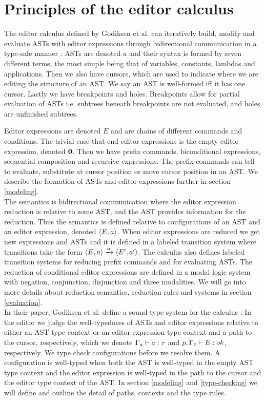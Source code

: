 \section{Principles of the editor calculus}
\label{principles}

The editor calculus defined by Godiksen et al. can iteratively build, modify
and evaluate ASTs with editor expressions through bidirectional communication in
a type-safe manner \pepm. ASTs are denoted $a$ and their syntax is formed by
seven different terms, the most simple being that of variables, constants,
lambdas and applications. Then we also have cursors, which are used to indicate
where we are editing the structure of an AST. We say an AST is well-formed iff
it has one cursor. Lastly we have breakpoints and holes. Breakpoints allow for
partial evaluation of ASTs i.e. subtrees beneath breakpoints are not evaluated,
and holes are unfinished subtrees.

Editor expressions are denoted $E$ and are chains of different commands and
conditions. The trivial case that end editor expressions is the empty editor
expression, denoted $\mathbf{0}$. Then we have prefix commands, biconditional
expressions, sequential composition and recursive expressions. The prefix
commands can tell to evaluate, substitute at cursor position or move cursor
position in an AST. We describe the formation of ASTs and editor expressions
further in section \ref{modeling}.\\

The semantics is bidirectional communication where the editor expression
reduction is relative to some AST, and the AST provides information for the
reduction. Thus the semantics is defined relative to configurations of an AST
and an editor expression, denoted $\langle E,a \rangle$. When editor expressions
are reduced we get new expressions and ASTs and it is defined in a labeled
transition system where transitions take the form $\langle E, a \rangle
\xrightarrow[]{\text{$\alpha$}} \langle E', a' \rangle$. The calculus also defines labeled
transition systems for reducing prefix commands and for evaluating ASTs. The
reduction of conditional editor expressions are defined in a modal logic system
with negation, conjunction, disjunction and three modalities. We will go into
more details about reduction semantics, reduction rules and systems in section
\ref{evaluation}.\\

In their paper, Godiksen et al. define a sound type system for the calculus
\pepm. In the editor we judge the well-typedness of ASTs and editor expressions
relative to either an AST type context or an editor expression type context and
a path to the cursor, respectively, which we denote $\Gamma_{a} \vdash
a : \tau$ and $p,\Gamma_{e} \vdash E : ok$, respectively. We type
check configurations before we resolve them. A configuration is well-typed when
both the AST is well-typed in the empty AST type context and the editor
expression is well-typed in the path to the cursor and the editor type context
of the AST. In section \ref{modeling} and \ref{type-checking} we will define
and outline the detail of paths, contexts and the type rules.

